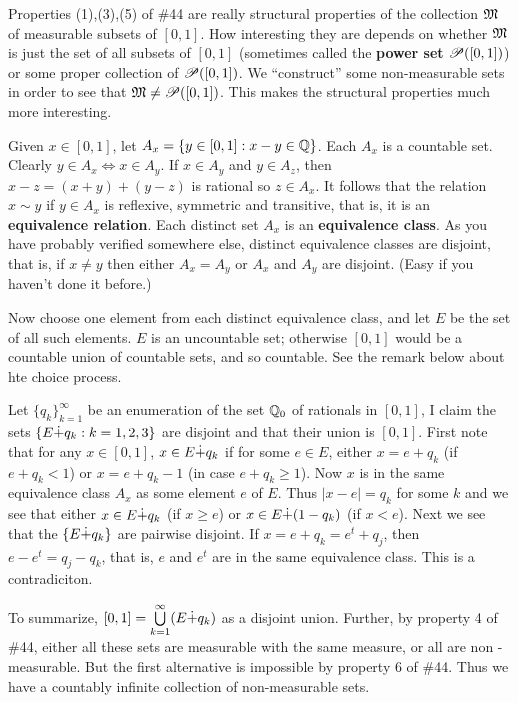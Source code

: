 \begin{rmk}%
	Properties (1),(3),(5) of \#44 are really structural properties of the collection 
	$\mathfrak{M}$ of measurable subsets of $[0,1]$. How interesting they are depends 
	on whether $\mathfrak{M}$ is just the set of all subsets of $[0,1]$ (sometimes 
	called the \textbf{power set} $\mathscr{P}([0,1])$) or some proper collection of 
	$\mathscr{P}([0,1])$. We ``construct'' some non-measurable sets in order to see 
	that $\mathfrak{M} \neq \mathscr{P}([0,1])$. This makes the structural properties 
	much more interesting. 

	Given $x \in [0,1]$, let $A_x = \{y \in [0,1] : x - y \in \mathbb{Q}\}$. 
	Each $A_x$ is a countable set. Clearly $y \in A_x \Leftrightarrow 
	x \in A_y$. If $x \in A_y$ and $y \in A_z$, then $x - z = (x + y) 
	+ (y - z)$ is rational so $z \in A_x$. It follows that the relation 
	$x \sim y$ if $y \in A_x$ is reflexive, symmetric and transitive, 
	that is, it is an \textbf{equivalence relation}. Each distinct set 
	$A_x$ is an \textbf{equivalence class}. As you have probably 
	verified somewhere else, distinct equivalence classes are disjoint, 
	that is, if $x \neq y$ then either $A_x = A_y$ or $A_x$ and $A_y$ 
	are disjoint. (Easy if you haven't done it before.)

	Now choose one element from each distinct equivalence class, and 
	let $E$ be the set of all such elements. $E$ is an uncountable set; 
	otherwise $[0,1]$ would be a countable union of countable sets, and 
	so countable. See the remark below about hte choice process. 

	Let $\{q_k\}_{k=1}^\infty$ be an enumeration of the set $\mathbb{Q}_0$ of 
	rationals in $[0,1]$, I claim the sets $\{E \dot{+} q_k : k = 1, 2, 3\}$ 
	are disjoint and that their union is $[0,1]$. First note that for 
	any $x \in [0,1]$, $x \in E \dot{+} q_k$ if for some $e \in E$, either 
	$x = e + q_k$ (if $e + q_k < 1$) or $x = e + q_k - 1$ (in case 
	$e + q_k \ge 1$). Now $x$ is in the same equivalence class $A_x$ as 
	some element $e$ of $E$. Thus $|x - e| = q_k$ for some $k$ and we 
	see that either $x \in E \dot{+} q_k$ (if $x \ge e$) or $x \in E \dot{+} 
	(1 - q_k)$ (if $x < e$). Next we see that the $\{E \dot{+} q_k\}$ are 
	pairwise disjoint. If $x = e + q_k = e^t + q_j$, then $e - e^t = 
	q_j - q_k$, that is, $e$ and $e^t$ are in the same equivalence 
	class. This is a contradiciton. 

	To summarize, $[0,1] = \bigcup\limits_{k=1}^\infty (E \dot{+} q_k)$ as 
	a disjoint union. Further, by property 4 of \#44, either all these 
	sets are measurable with the same measure, or all are non - 
	measurable. But the first alternative is impossible by property 6 
	of \#44. Thus we have a countably infinite collection of non-measurable 
	sets. 
\end{rmk}

